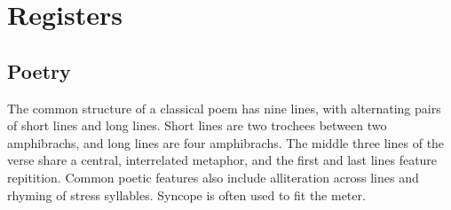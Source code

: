 \setchapterpreamble[u]{\margintoc}
\chapter{Registers}
\section{Poetry}
The common structure of a classical \langname{} poem has nine lines, with alternating pairs of short lines and long lines. Short lines are two trochees between two amphibrachs, and long lines are four amphibrachs. The middle three lines of the verse share a central, interrelated metaphor, and the first and last lines feature repitition. Common poetic features also include alliteration across lines and rhyming of stress syllables. Syncope is often used to fit the meter.
